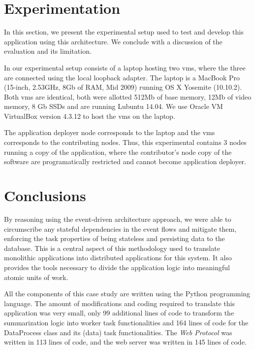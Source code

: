 \documentclass[12pt, titlepage]{uo_temp}
\begin{document}
     \section{Experimentation}
     In this section, we present the experimental setup used to test and develop this
     application using this architecture. We conclude with a discussion of the evaluation
     and its limitation.

     In our experimental setup consists of a laptop hosting two \gls{vm}s, where the three
     are connected using the local loopback adapter. The laptop is a MacBook Pro (15-inch,
     2.53GHz, 8Gb of RAM, Mid 2009) running OS X Yosemite (10.10.2). Both \gls{vm}s are
     identical, both were allotted 512Mb of base memory, 12Mb of video memory, 8 Gb SSDs
     and are running Lubuntu 14.04. We use Oracle VM VirtualBox version 4.3.12 to host the
     \gls{vm}s on the laptop.

     The application deployer node corresponds to the laptop and the \gls{vm}s
     corresponds to the contributing nodes. Thus, this experimental contains 3 nodes
     running a copy of the application, where the contributor's node copy of the software
     are programatically restricted and cannot become application deployer. 


     \section{Conclusions}
     By reasoning using the event-driven architecture approach, we were able to
     circumscribe any stateful dependencies in the event flows and mitigate them,
     enforcing the task properties of being stateless and persisting data to the
     database. This is a central aspect of this methodology used to translate monolithic
     applications into distributed applications for this system. It also provides the
     tools necessary to divide the application logic into meaningful atomic units of
     work. 

     All the components of this case study are written using the Python programming
     language. The amount of modifications and coding required to translate this
     application was very small, only 99 additional lines of code to transform the
     summarization logic into worker task functionalities and 164 lines of code for the
     DataProcess class and its (data) task functionalities. The \emph{Web Protocol} was
     written in 113 lines of code, and the web server was written in 145 lines of code.
\end{document}
